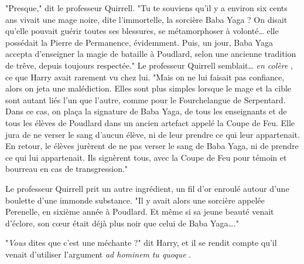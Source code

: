 "Presque," dit le professeur Quirrell. "Tu te souviens qu'il y a environ six cents ans vivait une mage noire, dite l'immortelle, la sorcière Baba Yaga ? On disait qu'elle pouvait guérir toutes ses blessures, se métamorphoser à volonté… elle possédait la Pierre de Permanence, évidemment. Puis, un jour, Baba Yaga accepta d'enseigner la magie de bataille à Poudlard, selon une ancienne tradition de trêve, depuis toujours respectée." Le professeur Quirrell semblait… \emph{en colère} , ce que Harry avait rarement vu chez lui. "Mais on ne lui faisait pas confiance, alors on jeta une malédiction. Elles sont plus simples lorsque le mage et la cible sont autant liés l'un que l'autre, comme pour le Fourchelangue de Serpentard. Dans ce cas, on plaça la signature de Baba Yaga, de tous les enseignants et de tous les élèves de Poudlard dans un ancien artefact appelé la Coupe de Feu. Elle jura de ne verser le sang d'aucun élève, ni de leur prendre ce qui leur appartenait. En retour, le élèves jurèrent de ne pas verser le sang de Baba Yaga, ni de prendre ce qui lui appartenait. Ils signèrent tous, avec la Coupe de Feu pour témoin et bourreau en cas de transgression."

Le professeur Quirrell prit un autre ingrédient, un fil d'or enroulé autour d'une boulette d'une immonde substance. "Il y avait alors une sorcière appelée Perenelle, en sixième année à Poudlard. Et même si sa jeune beauté venait d'éclore, son cœur était déjà plus noir que celui de Baba Yaga…."

"\emph{Vous}  dites que c'est une méchante ?" dit Harry, et il se rendit compte qu'il venait d'utiliser l'argument \emph{ad hominem}  \emph{tu quoque} .

